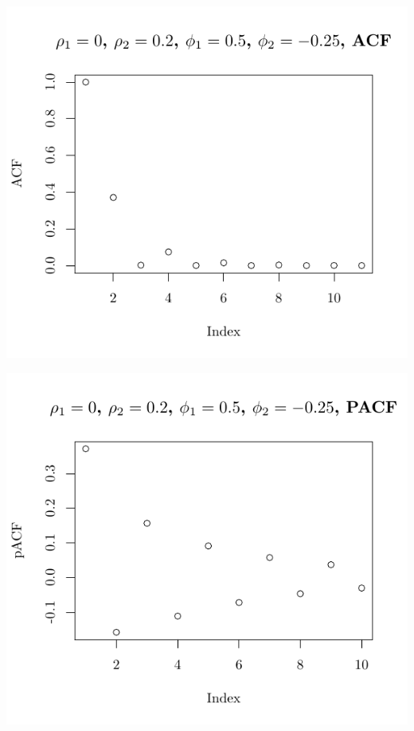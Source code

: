 \documentclass[10pt]{paper}\usepackage[]{graphicx}\usepackage[]{color}
\makeatletter
\def\maxwidth{ %
  \ifdim\Gin@nat@width>\linewidth
    \linewidth
  \else
    \Gin@nat@width
  \fi
}
\newenvironment{knitrout}{}{} %
\makeatother
\begin{document}
\begin{knitrout}
{\centering \includegraphics[width=\maxwidth]{figure/graphics-plotter-85} 

}




{\centering \includegraphics[width=\maxwidth]{figure/graphics-plotter-86} 

}





\end{knitrout}
\end{document}
